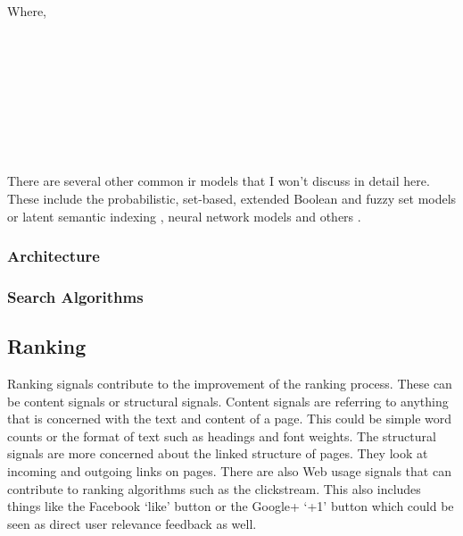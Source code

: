 Where,\\
 \\
 \\
 \\
 \\
 \\
 \\
 \\
 \\
 

There are several other common \gls{ir} models that I won't discuss in detail here. These include the probabilistic, set-based, extended Boolean and fuzzy set {\sloppy \autocite{Miyamoto2010, Miyamoto1988, Srinivasan2001, Widyantoro2001, Miyamoto1986}} models or latent semantic indexing \autocite{Deerwester1990}, neural network models and others \autocite{Macdonald2009, Schuetze1998, Schuetze}.



\subsubsection*{Architecture}





\subsubsection*{Search Algorithms}


\subsection{Ranking}

Ranking signals contribute to the improvement of the ranking process. These can be content signals or structural signals. Content signals are referring to anything that is concerned with the text and content of a page. This could be simple word counts or the format of text such as headings and font weights. The structural signals are more concerned about the linked structure of pages. They look at incoming and outgoing links on pages. There are also Web usage signals that can contribute to ranking algorithms such as the clickstream.  This also includes things like the Facebook `like' button or the Google+ `+1' button which could be seen as direct user relevance feedback as well.

